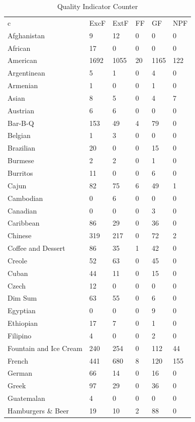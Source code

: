 \documentclass[letterpaper,10pt]{article}
\begin{document}
\begin{table}[h]
\centering
\caption{Quality Indicator Counter}
\label{tb:qic}
\begin{minipage}{.5\textwidth}
\begin{tabular}{llllll}
c & ExcF & ExtF & FF & GF & NPF \\
Afghanistan & 9 & 12 & 0 & 0 & 0 \\
African & 17 & 0 & 0 & 0 & 0 \\
American & 1692 & 1055 & 20 & 1165 & 122 \\
Argentinean & 5 & 1 & 0 & 4 & 0 \\
Armenian & 1 & 0 & 0 & 1 & 0 \\
Asian & 8 & 5 & 0 & 4 & 7 \\
Austrian & 6 & 6 & 0 & 0 & 0 \\
Bar-B-Q & 153 & 49 & 4 & 79 & 0 \\
Belgian & 1 & 3 & 0 & 0 & 0 \\
Brazilian & 20 & 0 & 0 & 15 & 0 \\
Burmese & 2 & 2 & 0 & 1 & 0 \\
Burritos & 11 & 0 & 0 & 6 & 0 \\
Cajun & 82 & 75 & 6 & 49 & 1 \\
Cambodian & 0 & 6 & 0 & 0 & 0 \\
Canadian & 0 & 0 & 0 & 3 & 0 \\
Caribbean & 86 & 29 & 0 & 36 & 0 \\
Chinese & 319 & 217 & 0 & 72 & 2 \\
Coffee and Dessert & 86 & 35 & 1 & 42 & 0 \\
Creole & 52 & 63 & 0 & 45 & 0 \\
Cuban & 44 & 11 & 0 & 15 & 0 \\
Czech & 12 & 0 & 0 & 0 & 0 \\
Dim Sum & 63 & 55 & 0 & 6 & 0 \\
Egyptian & 0 & 0 & 0 & 9 & 0 \\
Ethiopian & 17 & 7 & 0 & 1 & 0 \\
Filipino & 4 & 0 & 0 & 2 & 0 \\
Fountain and Ice Cream & 240 & 254 & 0 & 112 & 44 \\
French & 441 & 680 & 8 & 120 & 155 \\
German & 66 & 14 & 0 & 16 & 0 \\
Greek & 97 & 29 & 0 & 36 & 0 \\
Guatemalan & 4 & 0 & 0 & 0 & 0 \\
Hamburgers \& Beer & 19 & 10 & 2 & 88 & 0 \\

\end{tabular}
\end{minipage}
\end{table}
\end{document}
